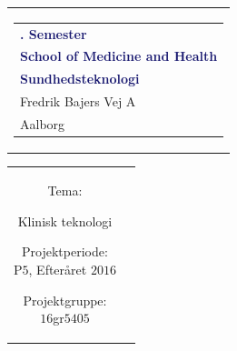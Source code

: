 % 
\thispagestyle{empty}
\begin{nopagebreak}
	{\samepage 
		
		\begin{tabular}{r}
			\parbox{\textwidth}{  
				\hfill \hspace{2cm} \parbox{8cm}{\begin{tabular}{l} %
						{\small \textbf{\textcolor{MidnightBlue}{{$5$. Semester}}}}\\
						{\small \textbf{\textcolor{MidnightBlue}{School of Medicine and Health}}}\\
						{\small \textbf{\textcolor{MidnightBlue}{Sundhedsteknologi}}}\\
						{\small \textcolor{NavyBlue}{Fredrik Bajers Vej $7$A}} \\
						{\small \textcolor{NavyBlue}{$9220$ Aalborg}} \\
			\end{tabular}}}
		\end{tabular}
		
		\begin{tabular}{cc}
			\parbox{7cm}{
				\begin{description}

%

\item {Tema:} 

\small{
Klinisk teknologi
}

\end{description}

\parbox{8cm}{

\begin{description}
\item {Projektperiode:}\\
   P$5$, Efteråret $2016$\\
   
\item {Projektgruppe:}\\
  $16$gr$5405$\\
  

\end{description}}}
\end{tabular}}
\end{nopagebreak}
